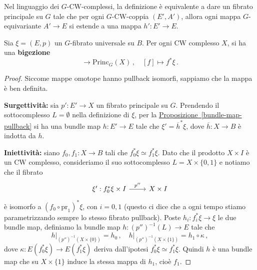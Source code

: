 Nel linguaggio dei $G$-CW-complessi, la definizione è equivalente a
dare un fibrato principale su $G$ tale che per ogni $G$-CW-coppia $(E',A')$,
allora ogni mappa $G$-equivariante $A' \to E$ si estende a una mappa $h':E' \to E$.

\begin{thm}\label{teo-classificazione}
	Sia $\xi = (E,p)$ un $G$-fibrato universale su $B$.
	Per ogni CW complesso $X$, si ha una \textbf{bigezione}
	\begin{equation*}
		[X,B] \longrightarrow \mathrm{Princ}_{G}(X)\,,
		\quad [f] \longmapsto f^{*}\xi\,. 
	\end{equation*}
	\begin{proof}
		Siccome mappe omotope hanno pullback isomorfi,
		sappiamo che la mappa è ben definita.
		
		\textbf{Surgettività:} sia $p':E' \to X$ un fibrato principale su $G$.
		Prendendo il sottocomplesso $L = \emptyset$ nella definizione di $\xi$,
		per la \hyperref[bundle-map-pullback]{Proposizione~\ref{bundle-map-pullback}}
		si ha una bundle map $h : E' \to E$ tale che $\xi' = \overline{h}^{*}\xi$,
		dove $\overline{h}:X \to B$ è indotta da $h$.
		
		\textbf{Iniettività:} siano $f_{0},f_{1}:X \to B$ tali che $f_{0}^{*}\xi \simeq f_{1}^{*}\xi$.
		Dato che il prodotto $X \times I$ è un CW complesso, consideriamo il suo sottocomplesso
		$L = X \times \{0,1\}$ e notiamo che il fibrato
		\begin{equation*}
			\begin{tikzcd}
				\xi' : f_{0}^{*}\xi \times I \ar[r, " p'' "]
				& X \times I
			\end{tikzcd}
		\end{equation*}
		è isomorfo a $(f_{0} \circ \mathrm{pr}_{1})^{*}\xi$, con $i =0,1$
		(questo ci dice che a ogni tempo stiamo parametrizzando sempre lo stesso fibrato pullback).
		Poste $h_{i}:f_{i}^{*}\xi 	\to \xi$ le due bundle map,
		definiamo la bundle map $h: \left( p'' \right)^{-1}(L) \to E$
		tale che
		\begin{equation*}
			h\vert_{\left( p'' \right)^{-1}(X \times \{0\})} = h_{0}\,, \quad
			h\vert_{\left( p'' \right)^{-1}(X \times \{1\})} = h_{1} \circ \kappa\,,
		\end{equation*}
		dove $\kappa : E(f_{0}^{*}\xi) \to E(f_{1}^{*}\xi)$ deriva
		dall'ipotesi $f_{0}^{*}\xi \simeq f_{1}^{*}\xi$.
		Quindi $h$ è una bundle map che su $X \times \{1\}$
		induce la stessa mappa di $h_{1}$, cioè $f_{1}$.
		

\end{proof}
\end{thm}

